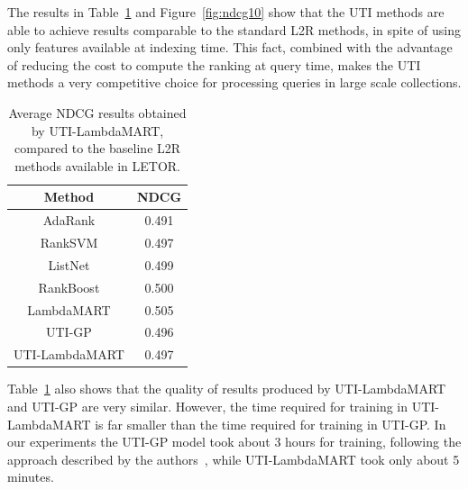 \documentclass[preprint,review,10pt,3p]{elsarticle}
\begin{document}
The results in Table~\ref{tab:baseline} and Figure~\ref{fig:ndcg10} show that the UTI methods are able to achieve results comparable to the standard L2R methods, in spite of using only features available at indexing time. This fact, combined with the advantage of reducing the cost to compute the ranking at query time, makes the UTI methods a very competitive choice for processing queries in large scale collections.


\begin{table}

\caption{Average NDCG results obtained by UTI-LambdaMART, compared to the baseline L2R methods available in LETOR.}

\label{tab:baseline}

\begin{center}

\begin{tabular}{|c|c|}

\hline

\textbf{Method} & \textbf{NDCG} \\

\hline\hline

AdaRank & 0.491 \\

\hline

RankSVM & 0.497 \\

\hline

ListNet & 0.499 \\

\hline

RankBoost & 0.500 \\

\hline

LambdaMART & 0.505 \\

\hline\hline

UTI-GP & 0.496\\

\hline

UTI-LambdaMART & 0.497 \\

\hline

\end{tabular}

\end{center}

\end{table}

Table~\ref{tab:baseline} also shows that the quality of results
produced by UTI-LambdaMART and UTI-GP are very similar. However, the
time required for training in UTI-LambdaMART is far smaller than
the time required for training in UTI-GP. In our
experiments the UTI-GP model took about 3 hours for training, following the approach described by the authors~\cite{costa2012lepref}, while UTI-LambdaMART took only
about 5 minutes.
\end{document}
